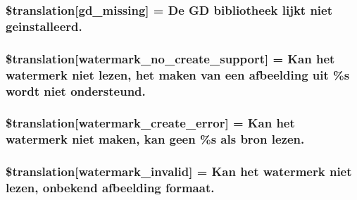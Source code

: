 \subsubsection[{\$translation}]{\setlength{\rightskip}{0pt plus 5cm}\$translation\mbox{[}\textquotesingle{}gd\+\_\+missing\textquotesingle{}\mbox{]} = \textquotesingle{}De G\+D bibliotheek lijkt niet geinstalleerd.\textquotesingle{}}\label{class_8upload_8nl___n_l_8php_a7f3dfcc0db4bbc0f2e7210c439798e56}
\hypertarget{class_8upload_8nl___n_l_8php_a82d5853430ab72dc1f9799ec36144cc6}{}
\subsubsection[{\$translation}]{\setlength{\rightskip}{0pt plus 5cm}\$translation\mbox{[}\textquotesingle{}watermark\+\_\+no\+\_\+create\+\_\+support\textquotesingle{}\mbox{]} = \textquotesingle{}Kan het watermerk niet lezen, het maken van een afbeelding uit \%s wordt niet ondersteund.\textquotesingle{}}\label{class_8upload_8nl___n_l_8php_a82d5853430ab72dc1f9799ec36144cc6}
\hypertarget{class_8upload_8nl___n_l_8php_aabca0b65dadbc6184415c16375f284ca}{}
\subsubsection[{\$translation}]{\setlength{\rightskip}{0pt plus 5cm}\$translation\mbox{[}\textquotesingle{}watermark\+\_\+create\+\_\+error\textquotesingle{}\mbox{]} = \textquotesingle{}Kan het watermerk niet maken, kan geen \%s als bron lezen.\textquotesingle{}}\label{class_8upload_8nl___n_l_8php_aabca0b65dadbc6184415c16375f284ca}
\hypertarget{class_8upload_8nl___n_l_8php_ac336e7a5701e47ba4a05e9e498a3cc44}{}
\subsubsection[{\$translation}]{\setlength{\rightskip}{0pt plus 5cm}\$translation\mbox{[}\textquotesingle{}watermark\+\_\+invalid\textquotesingle{}\mbox{]} = \textquotesingle{}Kan het watermerk niet lezen, onbekend afbeelding formaat.\textquotesingle{}}\label{class_8upload_8nl___n_l_8php_ac336e7a5701e47ba4a05e9e498a3cc44}
\hypertarget{class_8upload_8nl___n_l_8php_a1ecb4673e4fb69e06b3f20b65cecf30a}{}
